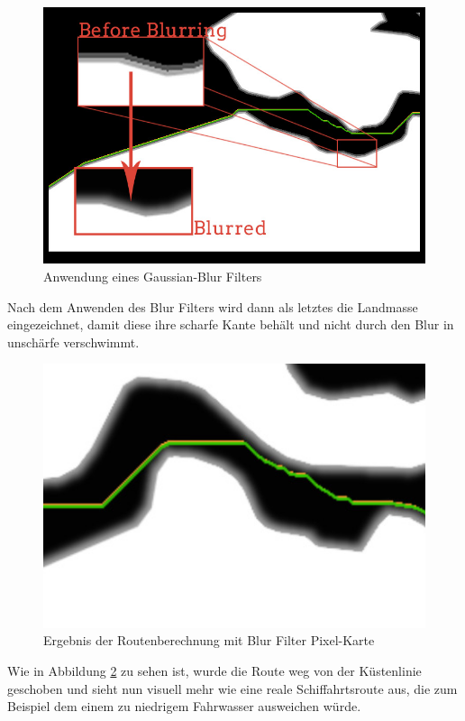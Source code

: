 \documentclass[letterpaper]{article}
\begin{document}
		\begin{figure}[!htbp]
			\centering
			\includegraphics[width=\linewidth]{blur_effect}
			\caption{Anwendung eines Gaussian-Blur Filters}
			\label{fig:blur effect}
		\end{figure}

		Nach dem Anwenden des Blur Filters wird dann als letztes die Landmasse eingezeichnet, damit diese ihre scharfe Kante behält und nicht durch den Blur in unschärfe verschwimmt.

		\begin{figure}[!htbp]
			\centering
			\includegraphics[width=\linewidth]{route_after_blur}
			\caption{Ergebnis der Routenberechnung mit Blur Filter Pixel-Karte}
			\label{fig:route after blur}
		\end{figure}

		Wie in Abbildung \ref{fig:route after blur} zu sehen ist, wurde die Route weg von der Küstenlinie geschoben und sieht nun visuell mehr wie eine reale Schiffahrtsroute aus, die zum Beispiel dem einem zu niedrigem Fahrwasser ausweichen würde.



{\footnotesize 
}
\end{document}
